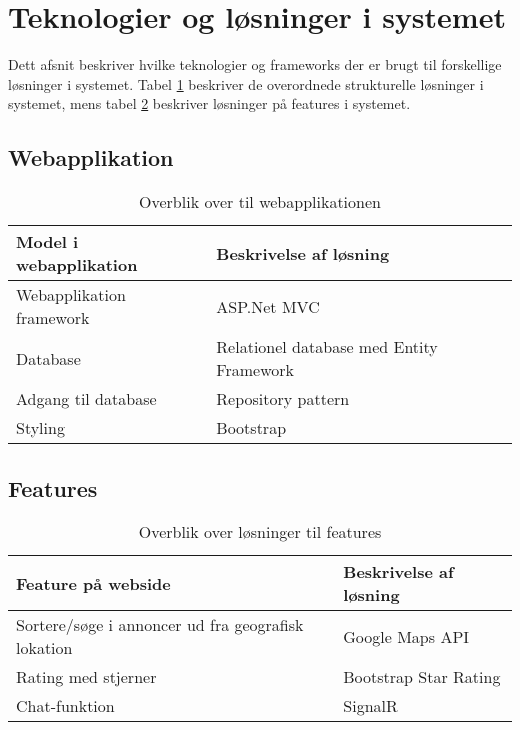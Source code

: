 \section{Teknologier og løsninger i systemet}
Dett afsnit beskriver hvilke teknologier og frameworks der er brugt til forskellige løsninger i systemet. Tabel \ref{fig:Webapplikation} beskriver de overordnede strukturelle løsninger i systemet, mens tabel \ref{fig:Features} beskriver løsninger på features i systemet.
\subsection{Webapplikation}

\begin{table}[H]
	\begin{tabular}{ | l | l |}
		\hline
		\textbf{Model i webapplikation}  & \textbf{Beskrivelse af løsning} \\ \hline
		Webapplikation framework  & ASP.Net MVC \\ \hline
		Database & Relationel database med Entity Framework \\ \hline
		Adgang til database & Repository pattern \\ \hline
		Styling & Bootstrap	 \\ \hline
	\end{tabular}
	\caption{Overblik over til webapplikationen}
	\label{fig:Webapplikation}
\end{table}

\subsection{Features}

\begin{table}[H]
	\begin{tabular}{ | l | p{5cm} |}
		\hline
		\textbf{Feature på webside}  & \textbf{Beskrivelse af løsning} \\ \hline
		Sortere/søge i annoncer ud fra geografisk lokation  & Google Maps API \\ \hline
		Rating med stjerner & Bootstrap Star Rating \\ \hline
		Chat-funktion & SignalR \\ \hline
		
	\end{tabular}
	\caption{Overblik over løsninger til features}
	\label{fig:Features}
\end{table}

